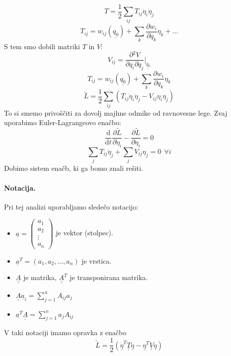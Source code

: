 \documentclass[a4paper]{article}
\newcommand{\pd}[2]{\frac{\partial {#1}}{\partial {#2}}}
\newcommand{\dd}[2]{\frac{\mathrm{d} {#1}}{\mathrm{d} {#2}}}
\newcommand{\duline}[1]{\underline{\underline{#1}}}
\begin{document}
$$T = \frac{1}{2}\sum_{ij} T_{ij} \dot\eta_i\dot\eta_j$$
$$T_{ij} = w_{ij}(\underline{q_0}) + \sum_{k} \pd{w_i}{q_k}\eta_k + \dots$$
S tem smo dobili matriki $T$ in $V$:
$$V_{ij} = \pd{^2 V}{q_i \partial q_j}\Big|_{\underline{q_0}}$$
$$T_{ij} = w_{ij}(\underline{q_0}) + \sum_{k}\pd{w_i}{q_k}\eta_k$$
$$\tilde{L} = \frac{1}{2}\sum_{ij}\left(T_{ij}\dot\eta_i\dot\eta_j - V_{ij}\eta_i\eta_j\right)$$
To si smemo privoščiti za dovolj majhne odmike od ravnovesne lege. Zvaj uporabimo Euler-Lagrangeovo enačbo:
$$\dd{}{t}\pd{\tilde{L}}{\dot\eta_i} - \pd{\tilde{L}}{\eta_i} = 0$$
$$\sum_{j} T_{ij}\ddot{\eta}_j + \sum_j V_{ij}\eta_j = 0~~\forall i$$
Dobimo sistem enačb, ki ga bomo znali rešiti.
\paragraph{Notacija.} Pri tej analizi uporabljamo sledečo notacijo:
\begin{itemize}
    \item $\underline{a} = \begin{pmatrix}
        a_1 \\ a_2 \\ \vdots \\ a_n
    \end{pmatrix}$ je vektor (stolpec).
    \item $\underline{a}^T = (a_1, a_2, ..., a_n)$ je vrstica.
    \item $\duline{A}$ je matrika, $\duline{A}^T$ je transponirana matrika.
    \item $\displaystyle{\duline{A}\underline{a}_i = \sum_{j=1}^{n} A_{ij}a_j}$
    \item $\displaystyle{\underline{a}^T\duline{A} = \sum_{j=1}^n a_j A_{ij}}$
\end{itemize}
V taki notaciji imamo opravka z enačbo
$$\tilde{L} = \frac{1}{2}\left(\underline{\dot\eta}^T\duline{T}\underline{\dot\eta} - \underline{\eta}^T\duline{V}\underline{\eta}\right)$$
\end{document}

